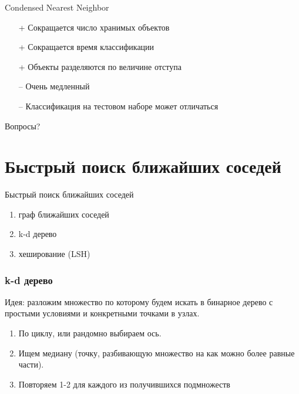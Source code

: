 \documentclass[10pt]{beamer}
\begin{document}
\begin{frame}{Condensed Nearest Neighbor}
	\begin{itemize} [<+- | alert@+>]
    	\item[+] Сокращается число хранимых объектов
	  \item[+] Сокращается время классификации
	  \item[+] Объекты разделяются по величине отступа
	  \bigbreak
	  \item[--] Очень медленный
	  \item[--] Классификация на тестовом наборе может отличаться
	\end{itemize}
\end{frame}

\begin{frame}[standout]
  Вопросы?
\end{frame}

\appendix

\section{Быстрый поиск ближайших соседей}

\begin{frame}{Быстрый поиск ближайших соседей}
	\begin{enumerate} [--]
		\item граф ближайших соседей
		\item k-d дерево
		\item хеширование (LSH)
	\end{enumerate}
\end{frame}

\begin{frame}\frametitle{k-d дерево}
	\alert{Идея}: разложим множество по которому будем искать в бинарное дерево с простыми условиями и конкретными точками в узлах.
	\bigbreak
	\uncover<2,3> {
	\begin{enumerate}
		\item По циклу, или рандомно выбираем ось.
		\item Ищем медиану (точку, разбивающую множество на как можно более равные части).
		\item Повторяем 1-2 для каждого из получившихся подмножеств 
	\end{enumerate}
	}
\end{frame}
\end{document}
